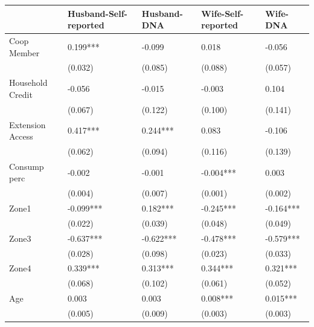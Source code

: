 \begin{tabular}{lllll}
\toprule
{} & Husband-Self-reported & Husband-DNA & Wife-Self-reported &   Wife-DNA \\
\midrule
Coop Member                          &              0.199*** &      -0.099 &              0.018 &     -0.056 \\
                                     &               (0.032) &     (0.085) &            (0.088) &    (0.057) \\
Household Credit                     &                -0.056 &      -0.015 &             -0.003 &      0.104 \\
                                     &               (0.067) &     (0.122) &            (0.100) &    (0.141) \\
Extension Access                     &              0.417*** &    0.244*** &              0.083 &     -0.106 \\
                                     &               (0.062) &     (0.094) &            (0.116) &    (0.139) \\
Consump perc                         &                -0.002 &      -0.001 &          -0.004*** &      0.003 \\
                                     &               (0.004) &     (0.007) &            (0.001) &    (0.002) \\
Zone1                                &             -0.099*** &    0.182*** &          -0.245*** &  -0.164*** \\
                                     &               (0.022) &     (0.039) &            (0.048) &    (0.049) \\
Zone3                                &             -0.637*** &   -0.622*** &          -0.478*** &  -0.579*** \\
                                     &               (0.028) &     (0.098) &            (0.023) &    (0.033) \\
Zone4                                &              0.339*** &    0.313*** &           0.344*** &   0.321*** \\
                                     &               (0.068) &     (0.102) &            (0.061) &    (0.052) \\
Age                                  &                 0.003 &       0.003 &           0.008*** &   0.015*** \\
                                     &               (0.005) &     (0.009) &            (0.003) &    (0.003) \\

\end{tabular}
